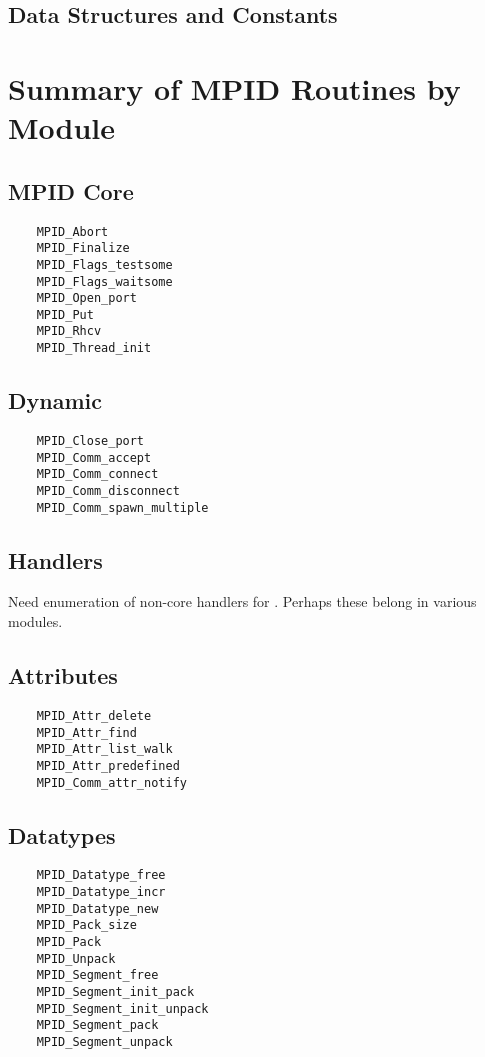 \documentclass{article}
\begin{document}
\subsection{Data Structures and Constants}




\section{Summary of MPID Routines by Module}

\subsection{MPID Core}
\begin{verbatim}
    MPID_Abort
    MPID_Finalize
    MPID_Flags_testsome
    MPID_Flags_waitsome
    MPID_Open_port
    MPID_Put
    MPID_Rhcv
    MPID_Thread_init
\end{verbatim}

\subsection{Dynamic}
\begin{verbatim}
    MPID_Close_port
    MPID_Comm_accept
    MPID_Comm_connect
    MPID_Comm_disconnect
    MPID_Comm_spawn_multiple
\end{verbatim}

\subsection{Handlers}
    Need enumeration of non-core handlers for .  Perhaps these 
    belong in various modules.

\subsection{Attributes}
\begin{verbatim}
    MPID_Attr_delete
    MPID_Attr_find
    MPID_Attr_list_walk
    MPID_Attr_predefined
    MPID_Comm_attr_notify
\end{verbatim}


\subsection{Datatypes}
\begin{verbatim}
    MPID_Datatype_free
    MPID_Datatype_incr
    MPID_Datatype_new
    MPID_Pack_size
    MPID_Pack
    MPID_Unpack
    MPID_Segment_free
    MPID_Segment_init_pack
    MPID_Segment_init_unpack
    MPID_Segment_pack
    MPID_Segment_unpack
\end{verbatim}
\end{document}
